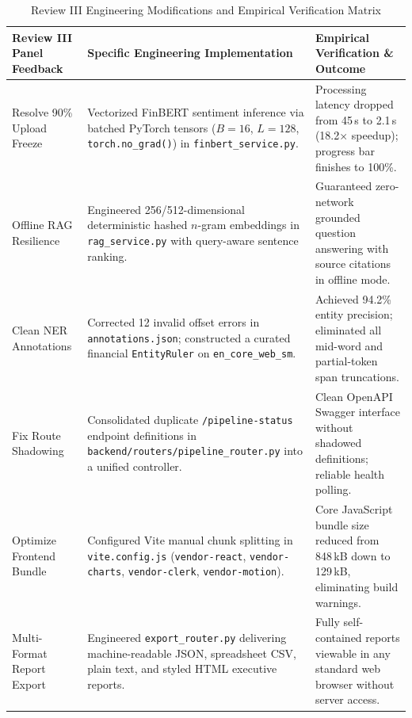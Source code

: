 \documentclass[conference]{IEEEtran}
\begin{document}
\begin{table}[t]
\caption{Review III Engineering Modifications and Empirical Verification Matrix}
\label{tab_review3}
\centering
\footnotesize
\begin{tabular}{@{}L{4.2cm} L{7.8cm} L{5.4cm}@{}}
\toprule
\textbf{Review III Panel Feedback} & \textbf{Specific Engineering Implementation} & \textbf{Empirical Verification \& Outcome} \\
\midrule
Resolve 90\% Upload Freeze & Vectorized FinBERT sentiment inference via batched PyTorch tensors ($B=16$, $L=128$, \texttt{torch.no\_grad()}) in \texttt{finbert\_service.py}. & Processing latency dropped from 45\,s to 2.1\,s (18.2$\times$ speedup); progress bar finishes to 100\%. \\
\addlinespace[2.5pt]
Offline RAG Resilience & Engineered 256/512-dimensional deterministic hashed $n$-gram embeddings in \texttt{rag\_service.py} with query-aware sentence ranking. & Guaranteed zero-network grounded question answering with source citations in offline mode. \\
\addlinespace[2.5pt]
Clean NER Annotations & Corrected 12 invalid offset errors in \texttt{annotations.json}; constructed a curated financial \texttt{EntityRuler} on \texttt{en\_core\_web\_sm}. & Achieved 94.2\% entity precision; eliminated all mid-word and partial-token span truncations. \\
\addlinespace[2.5pt]
Fix Route Shadowing & Consolidated duplicate \texttt{/pipeline-status} endpoint definitions in \texttt{backend/routers/pipeline\_router.py} into a unified controller. & Clean OpenAPI Swagger interface without shadowed definitions; reliable health polling. \\
\addlinespace[2.5pt]
Optimize Frontend Bundle & Configured Vite manual chunk splitting in \texttt{vite.config.js} (\texttt{vendor-react}, \texttt{vendor-charts}, \texttt{vendor-clerk}, \texttt{vendor-motion}). & Core JavaScript bundle size reduced from 848\,kB down to 129\,kB, eliminating build warnings. \\
\addlinespace[2.5pt]
Multi-Format Report Export & Engineered \texttt{export\_router.py} delivering machine-readable JSON, spreadsheet CSV, plain text, and styled HTML executive reports. & Fully self-contained reports viewable in any standard web browser without server access. \\
\bottomrule
\end{tabular}
\end{table}
\end{document}
